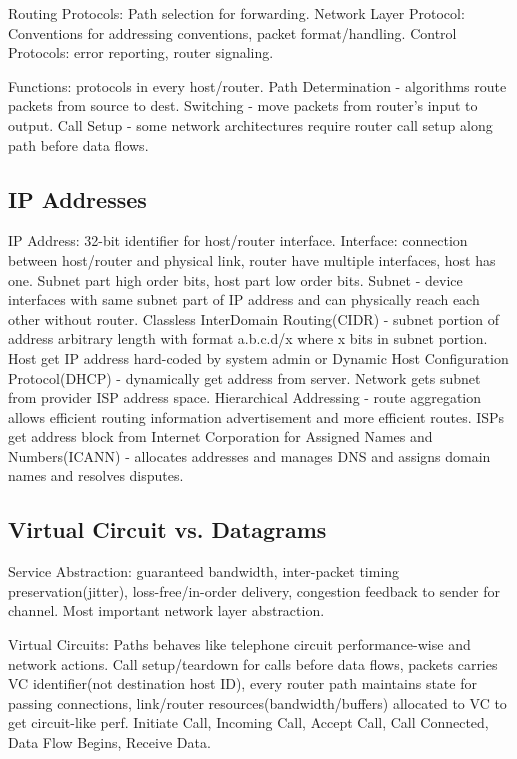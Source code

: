 \documentclass[8pt]{extarticle}
\begin{document}
\begin{multicols}{2}
Routing Protocols: Path selection for forwarding. Network Layer Protocol: Conventions for addressing conventions, packet format/handling. Control Protocols: error reporting, router signaling.

Functions: protocols in every host/router. Path Determination - algorithms route packets from source to dest.  Switching - move packets from router’s input to output. Call Setup - some network architectures require router call setup along path before data flows.

\subsection{IP Addresses}

IP Address: 32-bit identifier for host/router interface. Interface: connection between host/router and physical link, router have multiple interfaces, host has one. Subnet part high order bits, host part low order bits. Subnet - device interfaces with same subnet part of IP address and can physically reach each other without router. Classless InterDomain Routing(CIDR) - subnet portion of address arbitrary length with format a.b.c.d/x where x bits in subnet portion. Host get IP address hard-coded by system admin or Dynamic Host Configuration Protocol(DHCP) - dynamically get address from server. Network gets subnet from provider ISP address space. Hierarchical Addressing - route aggregation allows efficient routing information advertisement and more efficient routes. ISPs get address block from Internet Corporation for Assigned Names and Numbers(ICANN) - allocates addresses and manages DNS and assigns domain names and resolves disputes.

\subsection{Virtual Circuit vs. Datagrams}

Service Abstraction: guaranteed bandwidth, inter-packet timing preservation(jitter), loss-free/in-order delivery, congestion feedback to sender for channel. Most important network layer abstraction.

Virtual Circuits: Paths behaves like telephone circuit performance-wise and network actions. Call setup/teardown for calls before data flows, packets carries VC identifier(not destination host ID), every router path maintains state for passing connections, link/router resources(bandwidth/buffers) allocated to VC to get circuit-like perf. Initiate Call, Incoming Call, Accept Call, Call Connected, Data Flow Begins, Receive Data.


\end{multicols}
\end{document}
